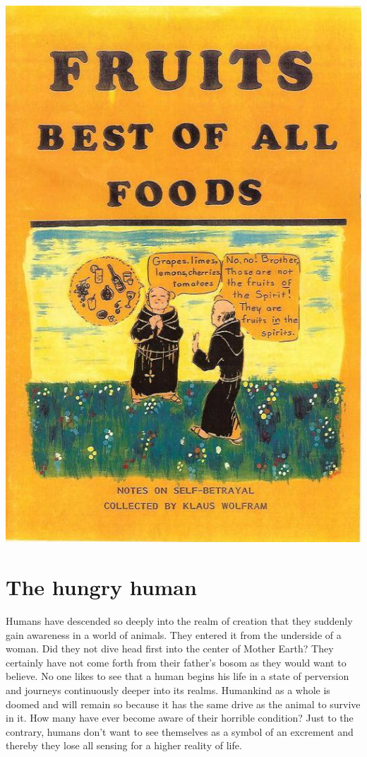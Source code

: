 \documentclass[12pt,letterpaper]{article}
\begin{document}



\includegraphics[height=1.1\textheight,bb= 0 0 529 797]{cover.jpg}


 
\thispagestyle{empty}
\tableofcontents




\section{The hungry human}

Humans have descended so deeply into the realm of creation that they
suddenly gain awareness in a world of animals. They entered it from
the underside of a woman. Did they not dive head first into the center
of Mother Earth? They certainly have not come forth from their
father's bosom as they would want to believe. No one likes to see that
a human begins his life in a state of perversion and journeys
continuously deeper into its realms. Humankind as a whole is doomed
and will remain so because it has the same drive as the animal to
survive in it. How many have ever become aware of their horrible
condition? Just to the contrary, humans don't want to see themselves
as a symbol of an excrement and thereby they lose all sensing for a
higher reality of life.
\end{document}
